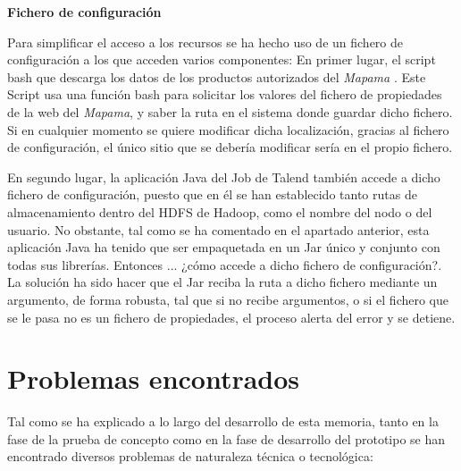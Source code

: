 \bigskip

\par 
\textbf{Fichero de configuración}
\par
Para simplificar el acceso a los recursos se ha hecho uso de un fichero de configuración a los que acceden varios componentes: En primer lugar, el script bash que descarga los datos de los productos autorizados del \textit{Mapama} \cite{mapama}. Este Script usa una función bash para solicitar los valores del fichero de propiedades de la web del \textit{Mapama}, y saber la ruta en el sistema donde guardar dicho fichero. Si en cualquier momento se quiere modificar dicha localización, gracias al fichero de configuración, el único sitio que se debería modificar sería en el propio fichero. 
\par En segundo lugar, la aplicación Java del Job de Talend también accede a dicho fichero de configuración, puesto que en él se han establecido tanto rutas de almacenamiento dentro del HDFS de Hadoop, como el nombre del nodo o del usuario. No obstante, tal como se ha comentado en el apartado anterior, esta aplicación Java ha tenido que ser empaquetada en un Jar único y conjunto con todas sus librerías. Entonces ... ¿cómo accede a dicho fichero de configuración?. La solución ha sido hacer que el Jar reciba la ruta a dicho fichero mediante un argumento, de forma robusta, tal que si no recibe argumentos, o si el fichero que se le pasa no es un fichero de propiedades, el proceso alerta del error y se detiene. 
\bigskip


\section{Problemas encontrados} \label{implementacion.problemas}
\par
Tal como se ha explicado a lo largo del desarrollo de esta memoria, tanto en la fase de la prueba de concepto como en la fase de desarrollo del prototipo se han encontrado diversos problemas de naturaleza técnica o tecnológica:

